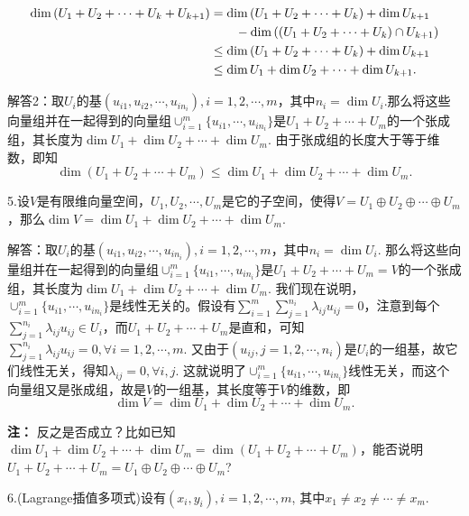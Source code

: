 \documentclass[hyperref,]{ctexart}
\begin{document}
\begin{equation}
\begin{aligned}
\dim(U_1+U_2+\cdots+U_{k}+U_{k+1})&= \dim(U_1+U_2+\cdots+U_{k})+\dim U_{k+1}\\
&\qquad -\dim((U_1+U_2+\cdots+U_{k})\cap U_{k+1})\\
&\le \dim(U_1+U_2+\cdots+U_{k})+\dim U_{k+1}\\
& \le \dim U_1+\dim U_2+\cdots+\dim U_{k+1}.
\end{aligned}\notag
\end{equation}

\noindent{}
解答2：取\(U_i\)的基\((u_{i1},u_{i2},\cdots,u_{in_i}),i=1,2,\cdots,m\)，其中\(n_i=\dim U_i\).那么将这些向量组并在一起得到的向量组\(\cup_{i=1}^m\{u_{i1},\cdots,u_{in_i}\}\)是\(U_1+U_2+\cdots+U_m\)的一个张成组，其长度为\(\dim U_1+\dim U_2+\cdots +\dim U_m\).
由于张成组的长度大于等于维数，即知
\[\dim(U_1+U_2+\cdots+U_m)\le \dim U_1+\dim U_2+\cdots+\dim U_m.\]

\bigskip

\noindent{}
5.设\(V\)是有限维向量空间，\(U_1,U_2,\cdots,U_m\)是它的子空间，使得\(V=U_1\oplus U_2\oplus\cdots\oplus U_m\)，那么\(\dim V=\dim U_1+\dim U_2+\cdots+\dim U_m\).

\noindent{}
解答：取\(U_i\)的基\((u_{i1},u_{i2},\cdots,u_{in_i}),i=1,2,\cdots,m\)，其中\(n_i=\dim U_i\).
那么将这些向量组并在一起得到的向量组\(\cup_{i=1}^m\{u_{i1},\cdots,u_{in_i}\}\)是\(U_1+U_2+\cdots+U_m=V\)的一个张成组，其长度为\(\dim U_1+\dim U_2+\cdots +\dim U_m\).
我们现在说明，\(\cup_{i=1}^m\{u_{i1},\cdots,u_{in_i}\}\)是线性无关的。假设有\(\sum_{i=1}^m\sum_{j=1}^{n_i}\lambda_{ij}u_{ij}=0\)，注意到每个\(\sum_{j=1}^{n_i}\lambda_{ij}u_{ij}\in U_i\)，而\(U_1+U_2+\cdots+U_m\)是直和，可知\(\sum_{j=1}^{n_i}\lambda_{ij}u_{ij}=0,\forall i=1,2,\cdots,m\).
又由于\((u_{ij},j=1,2,\cdots,n_i)\)是\(U_i\)的一组基，故它们线性无关，得知\(\lambda_{ij}=0,\forall i,j\).
这就说明了\(\cup_{i=1}^m\{u_{i1},\cdots,u_{in_i}\}\)线性无关，而这个向量组又是张成组，故是\(V\)的一组基，其长度等于\(V\)的维数，即
\[\dim V=\dim U_1+\dim U_2+\cdots+\dim U_m.\]

\noindent{} \textbf{注：}
反之是否成立？比如已知\(\dim U_1+\dim U_2+\cdots+\dim U_m=\dim(U_1+U_2+\cdots +U_m)\)，能否说明\(U_1+U_2+\cdots+ U_m=U_1\oplus U_2\oplus\cdots \oplus U_m\)?

\bigskip

\noindent{} 6.(Lagrange插值多项式)设有\((x_i,y_i),i=1,2,\cdots,m\),
其中\(x_1\ne x_2\ne\cdots\ne x_m\).
\end{document}
